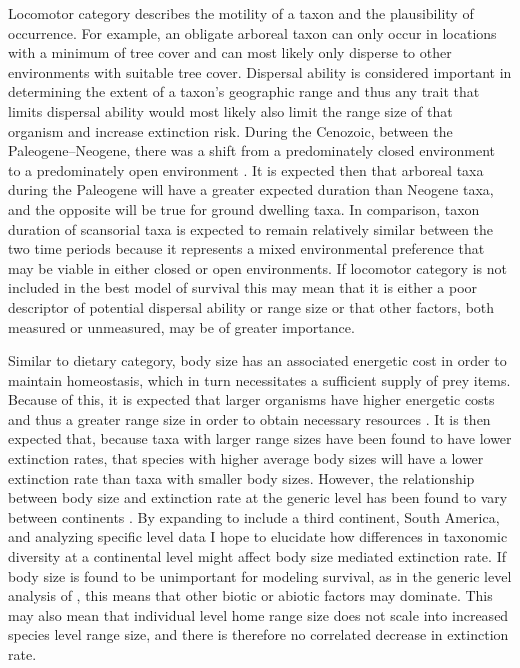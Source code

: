 \documentclass[12pt,letterpaper]{article}
\begin{document}
Locomotor category describes the motility of a taxon and the plausibility of occurrence. For example, an obligate arboreal taxon can only occur in locations with a minimum of tree cover and can most likely only disperse to other environments with suitable tree cover. Dispersal ability is considered important in determining the extent of a taxon's geographic range \citep{Birand2012,Jablonski2006a,Gaston2009} and thus any trait that limits dispersal ability would most likely also limit the range size of that organism and increase extinction risk. During the Cenozoic, between the Paleogene--Neogene, there was a shift from a predominately closed environment to a predominately open environment \citep{Janis1993a,Blois2009,Rose2006}. It is expected then that arboreal taxa during the Paleogene will have a greater expected duration than Neogene taxa, and the opposite will be true for ground dwelling taxa. In comparison, taxon duration of scansorial taxa is expected to remain relatively similar between the two time periods because it represents a mixed environmental preference that may be viable in either closed or open environments. If locomotor category is not included in the best model of survival this may mean that it is either a poor descriptor of potential dispersal ability or range size or that other factors, both measured or unmeasured, may be of greater importance.

Similar to dietary category, body size has an associated energetic cost in order to maintain homeostasis, which in turn necessitates a sufficient supply of prey items. Because of this, it is expected that larger organisms have higher energetic costs and thus a greater range size in order to obtain necessary resources \citep{Damuth1979,Brown1987,Damuth1979,Lyons2010}. It is then expected that, because taxa with larger range sizes have been found to have lower extinction rates, that species with higher average body sizes will have a lower extinction rate than taxa with smaller body sizes. However, the relationship between body size and extinction rate at the generic level has been found to vary between continents \citep{Tomiya2013,Liow2008}. By expanding to include a third continent, South America, and analyzing specific level data I hope to elucidate how differences in taxonomic diversity at a continental level might affect body size mediated extinction rate. If body size is found to be unimportant for modeling survival, as in the generic level analysis of \citet{Tomiya2013}, this means that other biotic or abiotic factors may dominate. This may also mean that individual level home range size does not scale into increased species level range size, and there is therefore no correlated decrease in extinction rate.
\end{document}
